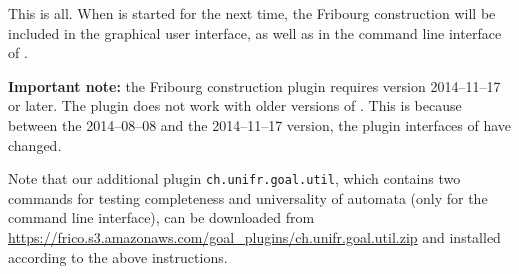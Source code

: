 This is all. When \goal{} is started for the next time, the Fribourg construction will be included in the graphical user interface, as well as in the command line interface of \goal.

\textbf{Important note:} the Fribourg construction plugin requires \goal{} version 2014--11--17 or later. The plugin does not work with older versions of \goal. This is because between the 2014--08--08 and the 2014--11--17 version, the plugin interfaces of \goal{} have changed.

Note that our additional plugin \texttt{ch.unifr.goal.util}, which contains two commands for testing completeness and universality of automata (only for the command line interface), can be downloaded from \url{https://frico.s3.amazonaws.com/goal_plugins/ch.unifr.goal.util.zip} and installed according to the above instructions.
